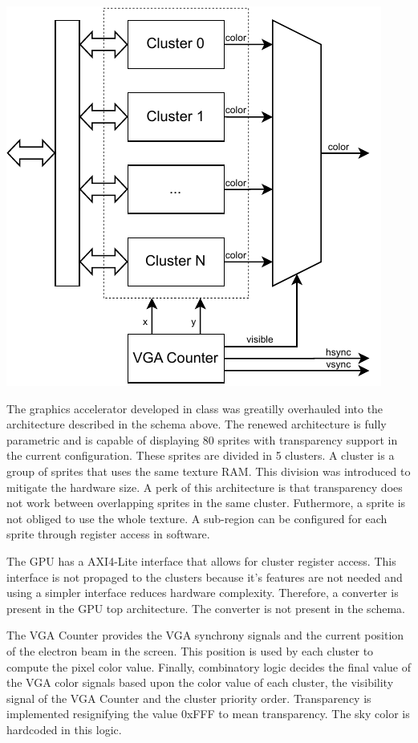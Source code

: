 \documentclass[12pt,a4paper]{article}
\begin{document}
\begin{center}
\includegraphics{schema1.pdf}
\label{fig:schema1}
\end{center} 

The graphics accelerator developed in class was greatilly overhauled into the
architecture described in the schema above. The renewed architecture is fully
parametric and is capable of displaying 80 sprites with transparency support 
in the current configuration. These sprites are divided in 5 clusters. 
A cluster is a group of sprites that uses the same texture RAM. This division
was introduced to mitigate the hardware size. A perk of this architecture is
that transparency does not work between overlapping sprites in the same cluster.
Futhermore, a sprite is not obliged to use the whole texture. A sub-region can
be configured for each sprite through register access in software.

The GPU has a AXI4-Lite interface that allows for cluster register access. This
interface is not propaged to the clusters because it's features are not needed
and using a simpler interface reduces hardware complexity. Therefore, a 
converter is present in the GPU top architecture. The converter is not present
in the schema.

The VGA Counter provides the VGA synchrony signals and the current position of
the electron beam in the screen. This position is used by each cluster to
compute the pixel color value. Finally, combinatory logic decides the final
value of the VGA color signals based upon the color value of each cluster,
the visibility signal of the VGA Counter and the cluster priority order. 
Transparency is implemented resignifying the value 0xFFF to mean transparency.
The sky color is hardcoded in this logic.
\end{document}
